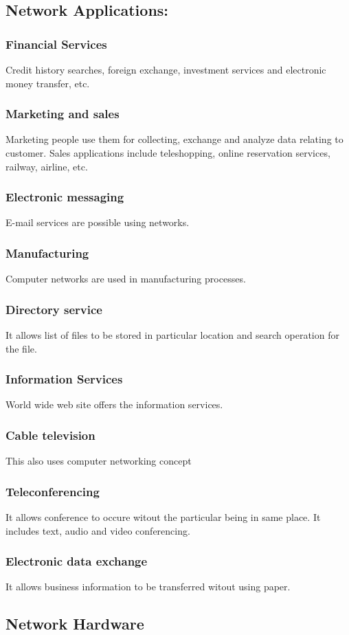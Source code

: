 \documentclass[11pt]{article}
\begin{document}
\subsection{Network Applications:}
\label{sec:org6d80ad6}
\subsubsection{Financial Services}
\label{sec:org405b9bf}
Credit history searches, foreign exchange, investment services and electronic money transfer, etc.
\subsubsection{Marketing and sales}
\label{sec:org03d5b2d}
Marketing people use them for collecting, exchange and analyze data relating to customer.
Sales applications include teleshopping, online reservation services, railway, airline, etc.
\subsubsection{Electronic messaging}
\label{sec:org8cdd962}
E-mail services are possible using networks.
\subsubsection{Manufacturing}
\label{sec:orgf9cf8e0}
Computer networks are used in manufacturing processes.
\subsubsection{Directory service}
\label{sec:org56e8dde}
It allows list of files to be stored in particular location and search operation for the file.
\subsubsection{Information Services}
\label{sec:orgbf977f3}
World wide web site offers the information services.
\subsubsection{Cable television}
\label{sec:org3c80206}
This also uses computer networking concept
\subsubsection{Teleconferencing}
\label{sec:org00519b9}
It allows conference to occure witout the particular being in same place.
It includes text, audio and video conferencing.
\subsubsection{Electronic data exchange}
\label{sec:org3a27551}
It allows business information to be transferred witout using paper.
\subsection{Network Hardware}
\label{sec:orgeb306ae}
\end{document}
